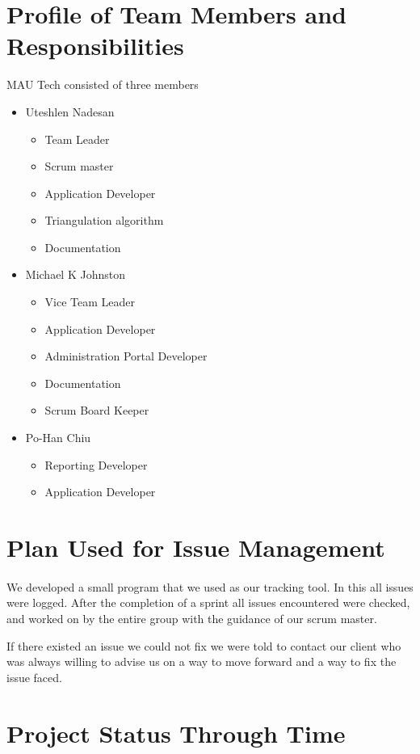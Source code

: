 \documentclass{article}
\begin{document}
\section{Profile of Team Members and Responsibilities}
MAU Tech consisted of three members
\begin{itemize}
\item Uteshlen Nadesan
\begin{itemize}
\item Team Leader
\item Scrum master
\item Application Developer
\item Triangulation algorithm
\item Documentation
\end{itemize}
\item Michael K Johnston
\begin{itemize}
\item Vice Team Leader
\item Application Developer
\item Administration Portal Developer
\item Documentation
\item Scrum Board Keeper
\end{itemize}
\item Po-Han Chiu
\begin{itemize}
\item Reporting Developer
\item Application Developer
\end{itemize}
\end{itemize}

\newpage
\section{Plan Used for Issue Management}
\paragraph{}We developed a small program that we used as our tracking tool. In this all issues were logged. After the completion of a sprint all issues encountered were checked, and worked on by the entire group with the guidance of our scrum master. 


If there existed an issue we could not fix we were told to contact our client who was always willing to advise us on a way to move forward and a way to fix the issue faced.

\section{Project Status Through Time}
\end{document}
